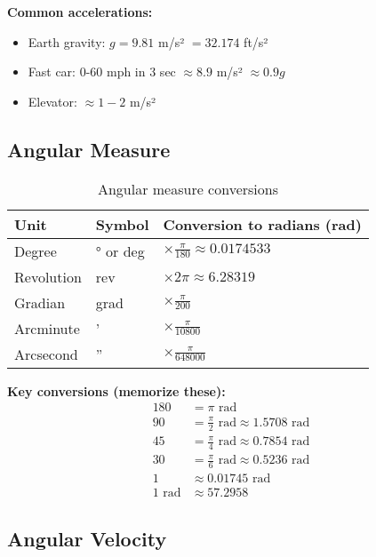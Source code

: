 \textbf{Common accelerations:}
\begin{itemize}
    \item Earth gravity: $g = 9.81$ m/s² $= 32.174$ ft/s²
    \item Fast car: 0-60 mph in 3 sec $\approx 8.9$ m/s² $\approx 0.9g$
    \item Elevator: $\approx 1-2$ m/s²
\end{itemize}

\subsection{Angular Measure}

\begin{table}[H]
\centering
\begin{tabular}{|l|l|l|}
\hline
\rowcolor{blue!20}
\textbf{Unit} & \textbf{Symbol} & \textbf{Conversion to radians (rad)} \\
\hline
Degree & ° or deg & $\times \frac{\pi}{180} \approx 0.0174533$ \\
\hline
Revolution & rev & $\times 2\pi \approx 6.28319$ \\
\hline
Gradian & grad & $\times \frac{\pi}{200}$ \\
\hline
Arcminute & ' & $\times \frac{\pi}{10800}$ \\
\hline
Arcsecond & '' & $\times \frac{\pi}{648000}$ \\
\hline
\end{tabular}
\caption{Angular measure conversions}
\end{table}

\textbf{Key conversions (memorize these):}
\begin{align*}
180 &= \pi \text{ rad} \\
90 &= \frac{\pi}{2} \text{ rad} \approx 1.5708 \text{ rad} \\
45 &= \frac{\pi}{4} \text{ rad} \approx 0.7854 \text{ rad} \\
30 &= \frac{\pi}{6} \text{ rad} \approx 0.5236 \text{ rad} \\
1 &\approx 0.01745 \text{ rad} \\
1 \text{ rad} &\approx 57.2958
\end{align*}

\subsection{Angular Velocity}

